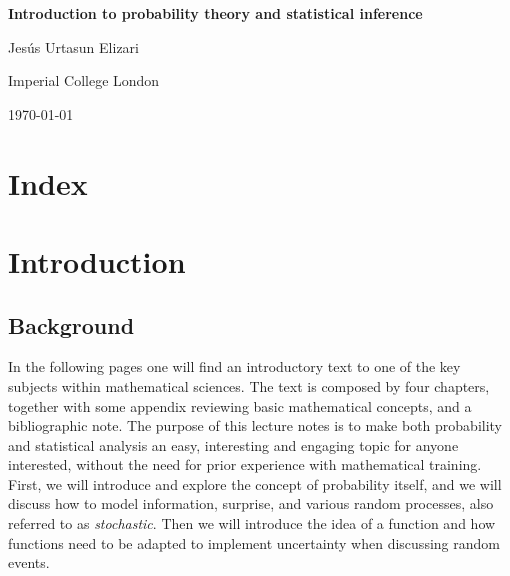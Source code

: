 \documentclass{book}
\begin{document}
\frontmatter

\begin{titlepage}
    \centering
    \vspace*{\fill}
    {\Huge\bfseries Introduction to probability theory and statistical inference\par}
    \vspace{1cm}
    {\Large Jes\'us Urtasun Elizari\par}
    \vspace{1cm}
     {\Large Imperial College London\par}
    \vspace{1cm}
    {\large\today\par}
    \vspace*{\fill}
\end{titlepage}

\tableofcontents

\chapter*{Index}
\printindex

\mainmatter

\chapter*{Introduction}

\section{Background}
\indent In the following pages one will find an introductory text to one of the key subjects within mathematical sciences. The text is composed by four chapters, together with some appendix reviewing basic mathematical concepts, and a bibliographic note. The purpose of this lecture notes is to make both probability and statistical analysis an easy, interesting and engaging topic for anyone interested, without the need for prior experience with mathematical training.\\

First, we will introduce and explore the concept of probability itself, and we will discuss how to model information, surprise, and various random processes, also referred to as \textit{stochastic}. Then we will introduce the idea of a function and how functions need to be adapted to implement uncertainty when discussing random events.\\
\end{document}
